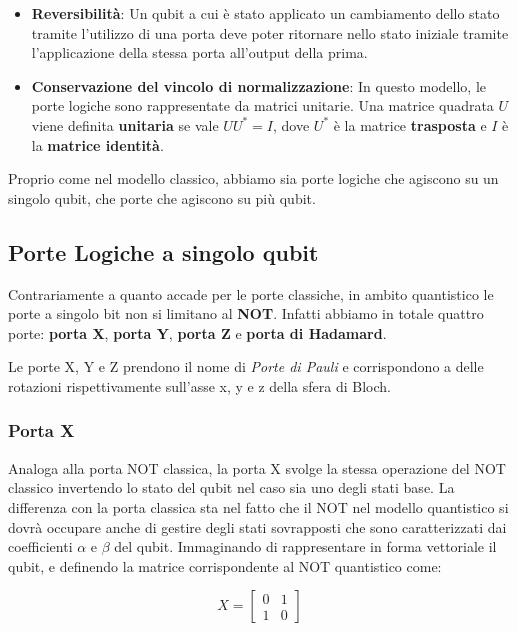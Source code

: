 \begin{itemize}
  \item \textbf{Reversibilità}: Un qubit a cui è stato applicato un cambiamento dello stato tramite l'utilizzo di una porta deve poter ritornare nello stato iniziale tramite l'applicazione della stessa porta all'output della prima.
  \item \textbf{Conservazione del vincolo di normalizzazione}: In questo modello, le porte logiche sono rappresentate da matrici unitarie. Una matrice quadrata \( U \) viene definita \textbf{unitaria} se vale \( UU^* = I \), dove \( U^* \) è la matrice \textbf{trasposta} e \( I \) è la \textbf{matrice identità}.
\end{itemize}

Proprio come nel modello classico, abbiamo sia porte logiche che agiscono su un singolo qubit, che porte che agiscono su più qubit.

\subsection{Porte Logiche a singolo qubit}
Contrariamente a quanto accade per le porte classiche, in ambito quantistico le porte a singolo bit non si limitano al \textbf{NOT}. Infatti abbiamo in totale quattro porte: \textbf{porta X}, \textbf{porta Y}, \textbf{porta Z} e \textbf{porta di Hadamard}. 

Le porte X, Y e Z prendono il nome di \textit{Porte di Pauli} e corrispondono a delle rotazioni rispettivamente sull'asse x, y e z della sfera di Bloch.

\subsubsection{Porta X}
Analoga alla porta NOT classica, la porta X svolge la stessa operazione del NOT classico invertendo lo stato del qubit nel caso sia uno degli stati base. La differenza con la porta classica sta nel fatto che il NOT nel modello quantistico si dovrà occupare anche di gestire degli stati sovrapposti che sono caratterizzati dai coefficienti \( \alpha \) e \( \beta \) del qubit.
Immaginando di rappresentare in forma vettoriale il qubit, e definendo la matrice corrispondente al NOT quantistico come:

\[
  X = 
  \begin{bmatrix}
    0 & 1 \\
    1 & 0
  \end{bmatrix}
\]

